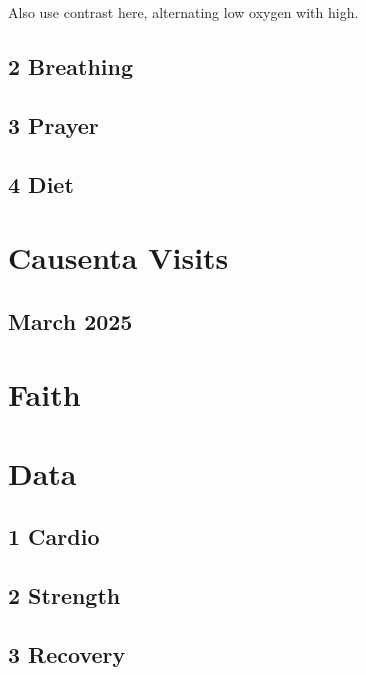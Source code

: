 \documentclass[
  letterpaper,
  DIV=11,
  numbers=noendperiod]{scrreprt}
\begin{document}
Also use contrast here, alternating low oxygen with high.

\chapter{2 Breathing}\label{breathing}

\chapter{3 Prayer}\label{prayer}

\chapter{4 Diet}\label{diet}

\part{Causenta Visits}

\chapter{March 2025}\label{march-2025}

\part{Faith}

\part{Data}

\chapter{1 Cardio}\label{cardio}

\chapter{2 Strength}\label{strength}

\chapter{3 Recovery}\label{recovery}
\end{document}
